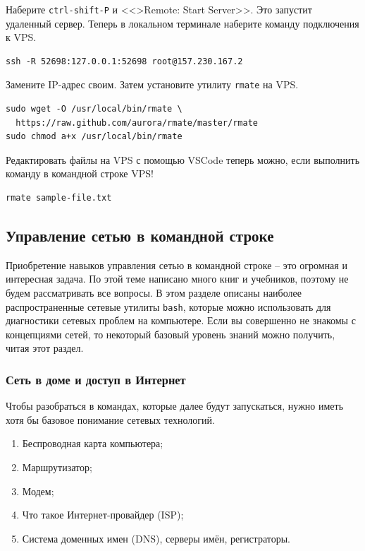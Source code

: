\documentclass[12pt]{article}
\providecommand{\tightlist}{%
  \setlength{\itemsep}{0pt}\setlength{\parskip}{0pt}}
\begin{document}
Наберите \texttt{ctrl-shift-P} и <<\textgreater Remote: Start Server>>. Это
запустит удаленный сервер. Теперь в локальном терминале наберите команду
подключения к VPS.
\begin{verbatim}
ssh -R 52698:127.0.0.1:52698 root@157.230.167.2
\end{verbatim}

Замените IP-адрес своим. Затем установите утилиту \texttt{rmate} на VPS.
\begin{verbatim}
sudo wget -O /usr/local/bin/rmate \
  https://raw.github.com/aurora/rmate/master/rmate
sudo chmod a+x /usr/local/bin/rmate
\end{verbatim}

Редактировать файлы на VPS с помощью VSCode теперь можно, если выполнить
команду в командной строке VPS!
\begin{verbatim}
rmate sample-file.txt
\end{verbatim}

\hypertarget{Networking-on-Command-Line}{%
\subsection{\texorpdfstring{\protect\hyperlink{Networking-on-Command-Line}{}Управление
сетью в командной
строке}{Управление сетью в командной строке}}\label{Networking-on-Command-Line}}

Приобретение навыков управления сетью в командной строке -- это огромная
и интересная задача. По этой теме написано много книг и учебников,
поэтому не будем рассматривать все вопросы. В этом разделе описаны
наиболее распространенные сетевые утилиты \texttt{bash}, которые можно
использовать для диагностики сетевых проблем на компьютере. Если вы
совершенно не знакомы с концепциями сетей, то некоторый базовый уровень
знаний можно получить, читая этот раздел.

\hypertarget{Your-home-network-and-the-internet}{%
\subsubsection{\texorpdfstring{\protect\hyperlink{Your-home-network-and-the-internet}{}Сеть
в доме и доступ в
Интернет}{Сеть в доме и доступ в Интернет}}\label{Your-home-network-and-the-internet}}

Чтобы разобраться в командах, которые далее будут запускаться, нужно
иметь хотя бы базовое понимание сетевых технологий.
\begin{enumerate}
\tightlist
\item
  Беспроводная карта компьютера;
\item
  Маршрутизатор;
\item
  Модем;
\item
  Что такое Интернет-провайдер (ISP);
\item
  Система доменных имен (DNS), серверы имён, регистраторы.
\end{enumerate}
\end{document}
